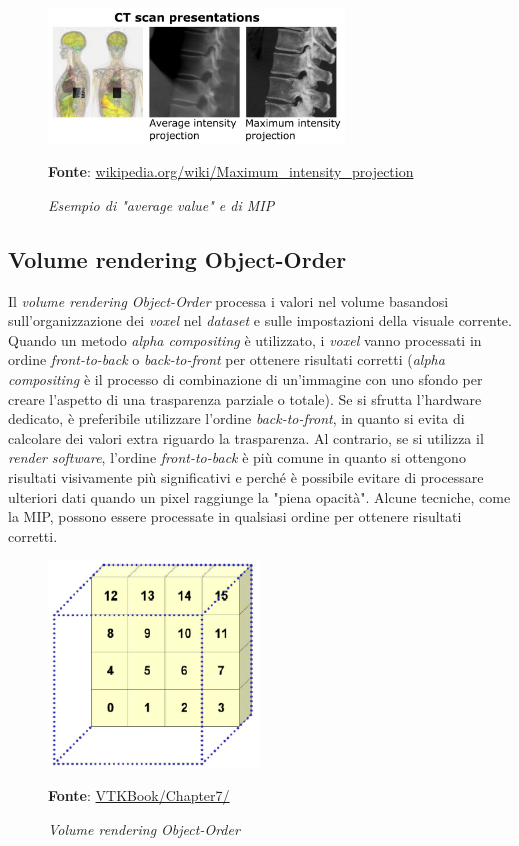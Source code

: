 \begin{figure}[h]
    \centering
    \includegraphics[width=0.7\textwidth]{immagini/volumerendering/mip.jpg}
    \caption{\textit{Esempio di "average value" e di MIP}}
    \textbf{Fonte}: \href{https://en.wikipedia.org/wiki/Maximum_intensity_projection}{wikipedia.org/wiki/Maximum\_intensity\_projection}
    \label{fig: Volume Rendering Example}
\end{figure}

\subsection{Volume rendering Object-Order}\label{sec:volume-object-order}
Il \emph{volume rendering Object-Order} processa i valori nel volume basandosi sull'organizzazione dei \emph{voxel} nel \emph{dataset} e sulle impostazioni della visuale corrente. Quando un metodo \emph{alpha compositing} è utilizzato, i \emph{voxel} vanno processati in ordine \emph{front-to-back} o \emph{back-to-front} per ottenere risultati corretti (\emph{alpha compositing} è il processo di combinazione di un'immagine con uno sfondo per creare l'aspetto di una trasparenza parziale o totale). Se si sfrutta l'hardware dedicato, è preferibile utilizzare l'ordine \emph{back-to-front}, in quanto si evita di calcolare dei valori extra riguardo la trasparenza. Al contrario, se si utilizza il \emph{render} \emph{software}, l'ordine \emph{front-to-back} è più comune in quanto si ottengono risultati visivamente più significativi e perché è possibile evitare di processare ulteriori dati quando un pixel raggiunge la "piena opacità". Alcune tecniche, come la MIP, possono essere processate in qualsiasi ordine per ottenere risultati corretti.

\begin{figure}[h]
    \centering
    \includegraphics[width=0.5\textwidth]{immagini/volumerendering/objectorder.png}
    \caption{\textit{Volume rendering Object-Order}}
    \textbf{Fonte}: \href{https://lorensen.github.io/VTKExamples/site/VTKBook/07Chapter7/}{VTKBook/Chapter7/}
    \label{fig: Volume Rendering Object-Order}
\end{figure}

